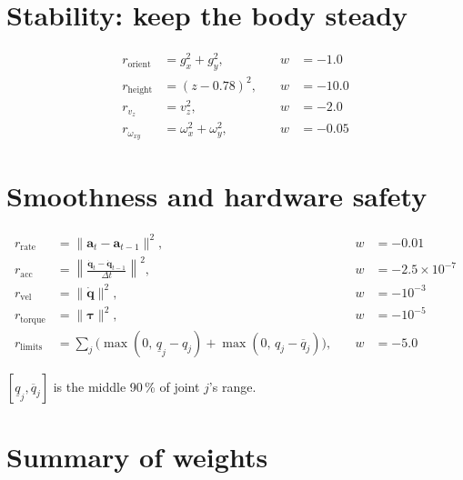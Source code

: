 \documentclass[11pt]{article}
\begin{document}
\section{Stability: keep the body steady}

\begin{equation}
\begin{aligned}
r_{\mathrm{orient}} &= g_x^2 + g_y^2, &\quad w &= -1.0 \\
r_{\mathrm{height}} &= (z - 0.78)^2, &\quad w &= -10.0 \\
r_{v_z} &= v_z^2, &\quad w &= -2.0 \\
r_{\omega_{xy}} &= \omega_x^2 + \omega_y^2, &\quad w &= -0.05
\end{aligned}
\end{equation}

\section{Smoothness and hardware safety}

\begin{equation}
\begin{aligned}
r_{\mathrm{rate}} &= \lVert \mathbf{a}_t - \mathbf{a}_{t-1} \rVert^2, &\quad w &= -0.01 \\
r_{\mathrm{acc}} &= \left\lVert \frac{\dot{\mathbf{q}}_t - \dot{\mathbf{q}}_{t-1}}{\Delta t} \right\rVert^2, &\quad w &= -2.5\times10^{-7} \\
r_{\mathrm{vel}} &= \lVert \dot{\mathbf{q}} \rVert^2, &\quad w &= -10^{-3} \\
r_{\mathrm{torque}} &= \lVert \bm{\tau} \rVert^2, &\quad w &= -10^{-5} \\
r_{\mathrm{limits}} &= \sum_j \Big(\max(0,\, \underline{q}_j - q_j) + \max(0,\, q_j - \overline{q}_j)\Big), &\quad w &= -5.0
\end{aligned}
\end{equation}

\noindent
$[\underline{q}_j, \overline{q}_j]$ is the middle 90\,\% of joint $j$'s range.

\section*{Summary of weights}
\end{document}
